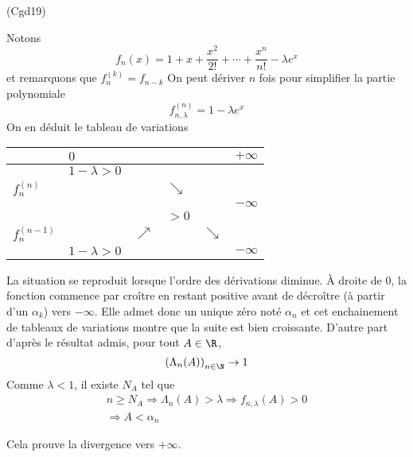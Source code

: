 \begin{tiny}(Cgd19)\end{tiny} Notons
\begin{displaymath}
 f_{n}(x) = 1 +x + \frac{x^2}{2!}+\cdots+\frac{x^n}{n!}-\lambda e^x
\end{displaymath}
et remarquons que $f_{n}^{(k)} =f_{n-k}$
On peut dériver $n$ fois pour simplifier la partie polynomiale
\begin{displaymath}
 f_{n,\lambda}^{(n)} = 1-\lambda e^x 
\end{displaymath}
On en déduit le tableau de variations
\begin{center}
\begin{tabular}{l|lllll}
                & $0$           &            &            &           & $+\infty$ \\\hline
                & $1-\lambda>0$ &            &            &           &           \\
$f_{n}^{(n)}$   &               &            & $\searrow$ &           &            \\
                &               &            &            &           & $-\infty$  \\ \hline
                &               &            & $>0$       &           &  \\
$f_{n}^{(n-1)}$ &               & $\nearrow$ &            &$\searrow$ &  \\
                & $1-\lambda>0$ &            &            &           & $-\infty$
\end{tabular}
\end{center}
La situation se reproduit lorsque l'ordre des dérivations diminue. \`A droite de $0$, la fonction commence par croître en restant positive avant de décroître (à partir d'un $\alpha_k$) vers $-\infty$. Elle admet donc un unique zéro noté $\alpha_n$ et cet enchainement de tableaux de variations montre que la suite est bien croissante. D'autre part d'après le résultat admis, pour tout $A\in \R$,
\begin{displaymath}
 \left( \Lambda_n(A)\right) _{n\in \N} \rightarrow 1
\end{displaymath}
Comme $\lambda <1$, il existe $N_A$ tel que 
\begin{multline*}
 n\geq N_A \Rightarrow \Lambda_n(A) > \lambda \Rightarrow f_{n,\lambda}(A)>0\\
\Rightarrow A< \alpha_n
\end{multline*}

Cela prouve la divergence vers $+\infty$.
